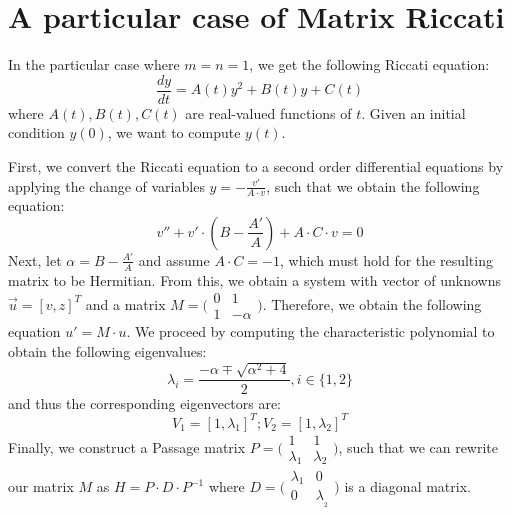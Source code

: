 \chapter{A particular case of Matrix Riccati}

In the particular case where $m=n=1$, we get the following Riccati equation:
\begin{equation}
    \frac{dy}{dt} = A(t)y^2 + B(t)y + C(t)
\end{equation}
where $A(t), B(t), C(t)$ are real-valued functions of $t$. Given an initial condition $y(0)$, we want to compute $y(t)$.

First, we convert the Riccati equation to a second order differential equations by applying the change of variables $y = - \frac{v'}{A\cdot v}$, such that we obtain the following equation:
\begin{equation*}
    v'' + v' \cdot (B - \frac{A'}{A}) + A\cdot C\cdot v = 0
\end{equation*}
Next, let $\alpha = B - \frac{A'}{A}$ and assume $A\cdot C = -1$, which must hold for the resulting matrix to be Hermitian. From this, we obtain a system with vector of unknowns $\Vec{u} = [v, z]^T$ and a matrix $M = 
    \big(\begin{smallmatrix}
      0 & 1\\
      1 & -\alpha
    \end{smallmatrix}\big)$. Therefore, we obtain the following equation $u' = M\cdot u$. We proceed by computing the characteristic polynomial to obtain the following eigenvalues:
\begin{equation*}
    \lambda_i = \frac{-\alpha \mp \sqrt{\alpha^2 + 4}}{2}, i \in \{1,2\}
\end{equation*}
and thus the corresponding eigenvectors are:
\begin{equation*}
    V_1 = [1, \lambda_1]^T; V_2 = [1, \lambda_2]^T
\end{equation*}
Finally, we construct a Passage matrix $P = \big(\begin{smallmatrix}
      1 & 1\\
      \lambda_1 & \lambda_2
    \end{smallmatrix}\big)$, such that we can rewrite our matrix $M$ as $H = P \cdot D \cdot P^{-1}$ where $D = \big(\begin{smallmatrix}
      \lambda_1 & 0\\
      0 & \lambda__2
    \end{smallmatrix}\big)$ is a diagonal matrix.
    
